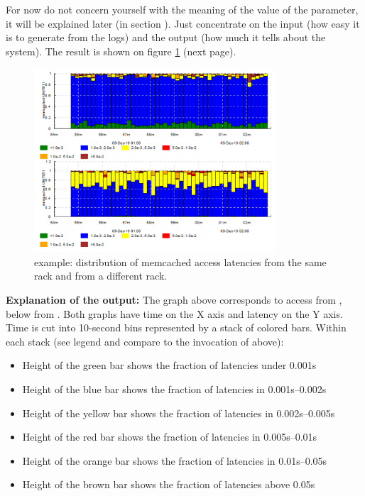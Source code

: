\documentclass{article}
\begin{document}
For now do not concern yourself with the meaning of the value of the  parameter, it will be explained later (in section ). Just concentrate on the input (how easy it is to generate from the logs) and the output (how much it tells about the system). The result is shown on figure \ref{fig:tplot-motivating-example} (next page).

\pagebreak

\begin{figure}[h]
\center
\includegraphics[width=0.8\textwidth]{pics/tplot/tplot-motivating-example.png}
\caption{\timeplot{} example: distribution of memcached access latencies from the same rack and from a different rack.}
\label{fig:tplot-motivating-example}
\end{figure}

\textbf{Explanation of the output:} The graph above corresponds to access from , below from . Both graphs have time on the X axis and latency on the Y axis. Time is cut into 10-second bins represented by a stack of colored bars. Within each stack (see legend and compare to the invocation of  above):
\begin{itemize}
\item Height of the green bar shows the fraction of latencies under 0.001s
\item Height of the blue bar shows the fraction of latencies in 0.001s--0.002s
\item Height of the yellow bar shows the fraction of latencies in 0.002s--0.005s
\item Height of the red bar shows the fraction of latencies in 0.005s--0.01s
\item Height of the orange bar shows the fraction of latencies in 0.01s--0.05s
\item Height of the brown bar shows the fraction of latencies above 0.05s
\end{itemize}
\end{document}
